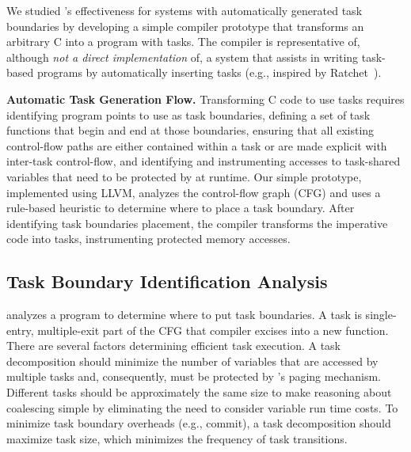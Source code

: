 We studied \sys's effectiveness for systems with automatically generated task
boundaries by developing a simple compiler prototype that transforms an
arbitrary C into a program with tasks. The compiler is representative of,
although \emph{not a direct implementation} of, a system that assists in writing
task-based programs by automatically inserting tasks (e.g., inspired by
Ratchet~\cite{ratchet}). 

\textbf{Automatic Task Generation Flow.} Transforming C code to use tasks requires identifying program points to use as task boundaries, defining a set of task functions that begin and end at those boundaries, ensuring that all existing control-flow paths are either contained within a task or are made explicit with inter-task control-flow, and identifying and instrumenting accesses to task-shared variables that need to be protected by \sys at runtime. Our simple prototype, implemented using LLVM, analyzes the control-flow graph (CFG) and uses a rule-based heuristic to determine where to place a task boundary. After identifying task boundaries placement, the \sys compiler transforms the imperative code into tasks, instrumenting protected memory accesses. 

\subsection{Task Boundary Identification Analysis}
\label{sec:compiler_analysis_pass}

\sys analyzes a program to determine where to put task boundaries. A task is single-entry, multiple-exit part of the CFG that \sys compiler excises into a new function. There are several factors determining efficient task execution. A task decomposition should minimize the number of variables that are accessed by multiple tasks and, consequently, must be protected by \sys's paging mechanism. Different tasks should be approximately the same size to make reasoning about coalescing simple by eliminating the need to consider variable run time costs. To minimize task boundary overheads (e.g., commit), a task decomposition should maximize task size, which minimizes the frequency of task transitions.

